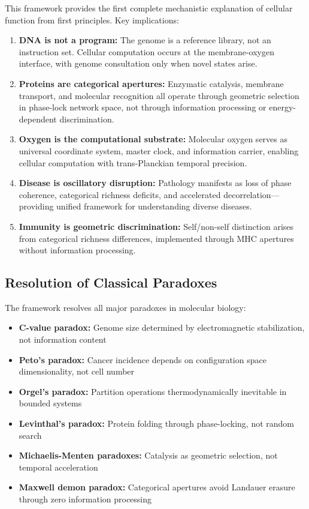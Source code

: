 \documentclass[12pt,a4paper]{article}
\begin{document}
This framework provides the first complete mechanistic explanation of cellular function from first principles. Key implications:

\begin{enumerate}
\item \textbf{DNA is not a program:} The genome is a reference library, not an instruction set. Cellular computation occurs at the membrane-oxygen interface, with genome consultation only when novel states arise.

\item \textbf{Proteins are categorical apertures:} Enzymatic catalysis, membrane transport, and molecular recognition all operate through geometric selection in phase-lock network space, not through information processing or energy-dependent discrimination.

\item \textbf{Oxygen is the computational substrate:} Molecular oxygen serves as universal coordinate system, master clock, and information carrier, enabling cellular computation with trans-Planckian temporal precision.

\item \textbf{Disease is oscillatory disruption:} Pathology manifests as loss of phase coherence, categorical richness deficits, and accelerated decorrelation—providing unified framework for understanding diverse diseases.

\item \textbf{Immunity is geometric discrimination:} Self/non-self distinction arises from categorical richness differences, implemented through MHC apertures without information processing.
\end{enumerate}

\subsection{Resolution of Classical Paradoxes}

The framework resolves all major paradoxes in molecular biology:

\begin{itemize}
\item \textbf{C-value paradox:} Genome size determined by electromagnetic stabilization, not information content
\item \textbf{Peto's paradox:} Cancer incidence depends on configuration space dimensionality, not cell number
\item \textbf{Orgel's paradox:} Partition operations thermodynamically inevitable in bounded systems
\item \textbf{Levinthal's paradox:} Protein folding through phase-locking, not random search
\item \textbf{Michaelis-Menten paradoxes:} Catalysis as geometric selection, not temporal acceleration
\item \textbf{Maxwell demon paradox:} Categorical apertures avoid Landauer erasure through zero information processing
\end{itemize}
\end{document}
